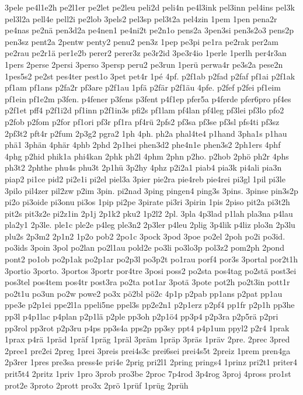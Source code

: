 {3pele
pe4l1e2h
pe2l1er
pe2let
pe2leu
peli2d
peli4n
pe4l3ink
pel3inn
pel4ins
pel3k
pel3l2a
pell4e
pell2i
pe2lob
3pels2
pel3sp
pel3t2a
pel4zin
1pem
1pen
pena2r
pe4nas
pe2nä
pen3d2a
pe4nen1
pe4ni2t
pe2n1o
pens2a
3pen3si
pen3s2o3
pens2p
pen3sz
pent2a
2pentw
penty2
penu2
pen3z
1pep
pe3pi
pe1ra
pe2rak
per2am
pe2rau
pe2r1ä
per1e2b
perer2
perer3z
pe3r2id
3pe3r4io
1perle
1perlh
per4r3an
1pers
2perse
2persi
3perso
3persp
peru2
pe3run
1perü
perwa4r
pe3s2a
pese2n
1pes5s2
pe2st
pes4ter
pest1o
3pet
pet4r
1pé
4pf.
p2f1ab
p2fad
p2faf
pf1ai
p2f1ak
pf1am
pf1ans
p2fa2r
pf3are
p2f1au
1pfä
p2fär
p2f1äu
4pfe.
p2fef
p2fei
pf1eim
pf1ein
pf1e2m
p3fen.
p4fener
p3fens
p3fent
p4f1ep
pfer5a
p4ferde
pfer6pro
pf4es
p2f1et
pff4
p2f1i2d
pf1inn
p2f1in3s
pfi2s
pf1lam
pf4lan
pf4leg
pf3lei
pf3lo
pfo2
p2fob
p2fom
p2for
pf1ori
pf3r
pf1ra
pf4rü
2pfs2
pf3sa
pf3se
pf3sl
pfs4ti
pf3sz
2pf3t2
pft4r
p2fum
2p3g2
pgra2
1ph
4ph.
ph2a
phal4te4
p1hand
3pha1s
p1hau
phä1
3phän
4phär
4phb
2phd
2p1hei
phen3d2
phe4n1e
phen3s2
2ph1ers
4phf
4phg
p2hid
phik1a
phi4kan
2phk
ph2l
4phm
2phn
p2ho.
p2hob
2phö
ph2r
4phs
ph3t2
2phthe
phu4s
phu3t
2p1hü
3p2hy
4phz
p2i2a1
piab4
pia3k
pi4ali
pia3n
piap2
pi1ce
pid2
pi2e1i
pi2el
piel3a
3pier
pie2ra
pie4reb
pie4rei
pi3gl
1pil
pi3le
3pilo
pil4zer
pil2zw
p2im
3pin.
pi2nad
3ping
pingen4
ping3s
3pins.
3pinse
pin3s2p
pi2o
pi3oide
pi3onu
pi3os
1pip
pi2pe
3pirate
pi3ri
3pirin
1pis
2piso
pit2a
pi3t2h
pit2s
pit3z2e
pi2z1in
2p1j
2p1k2
pku2
1p2l2
2pl.
3pla
4p3lad
p1lah
pla3na
p4lau
pla2y1
2p3le.
ple1c
ple2e
p4leg
ple3n2
2p3ler
p4leu
2plig
3p4lik
p4liz
plo3n
2p3lu
plu2s
2p3m2
2p1n2
1p2o
pob2
2po1c
3pock
3pod
3poe
po2el
2poh
po2i
po3id.
po3ids
3poin
3pol
po2lan
po2l1au
pold2e
po3li
po3lo3p
pol3z2
pom2ph
2pond
pont2
po1ob
po2p1ak
po2p1ar
po2p3l
po3p2t
po1rau
porf4
por3s
3portal
por2t1h
3portio
3porto.
3portos
3portr
por4tre
3posi
poss2
po2sta
pos4tag
po2stä
post3ei
pos3tel
pos4tem
pos4tr
post3ra
po2ta
pot1ar
3potä
3pote
pot2h
po2t3in
pott1r
po2t1u
po3un
po2w
powe2
po3x
pö2bl
pö2c
4p1p
p2pab
pp1ans
p2pat
pp1au
ppe3e
p2p1ei
ppe2l1a
ppeli5ne
ppel3s
pp2e2n1
p2p1erz
p2pf4
pp1fr
p2p1h
pp3he
pp3l
p4p1lac
p4plan
p2p1lä
p2ple
pp3oh
p2p1ö4
pp3p4
p2p3ra
p2p5rä
p2pri
pp3rol
pp3rot
p2p3ru
p4ps
pp3s4a
pps2p
pp3sy
ppt4
p4p1um
ppyl2
p2r4
1prak
1prax
p4rä
1präd
1präf
1präg
1präl
3präm
1präp
3präs
1präv
2pre.
2prec
3pred
2pree1
pre2ei
2preg
1prei
3preis
prei4s3c
prei6sei
prei4s5t
2preiz
1prem
pren4ga
2p3rer
1pres
pre3sa
press4e
pri4e
2prig
pri2l1
2pring
prings4
1prinz
pri2t1
priter4
prit5t4
2pritz
1priv
1pro
3prob
pro3be
2proc
7p4rod
3p4rog
3proj
4pross
pro1st
prot2e
3proto
2prott
pro3x
2prö
1prüf
1prüg
2prüh
}
